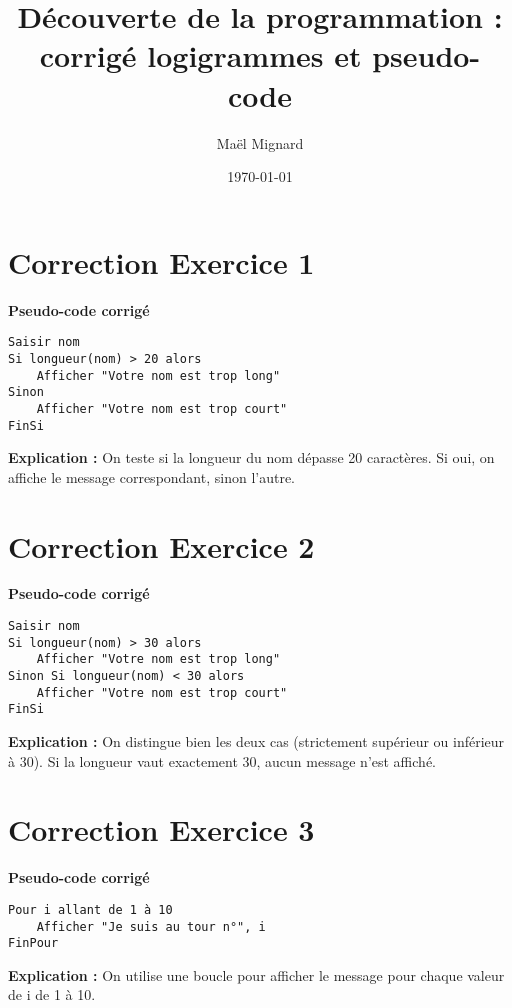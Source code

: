 \documentclass[12pt,a4paper]{article}
\title{Découverte de la programmation : corrigé logigrammes et pseudo-code}
\author{Maël Mignard}
\date{\today}
\begin{document}
\maketitle

\section*{Correction Exercice 1}
\textbf{Pseudo-code corrigé}
\begin{verbatim}
Saisir nom
Si longueur(nom) > 20 alors
    Afficher "Votre nom est trop long"
Sinon
    Afficher "Votre nom est trop court"
FinSi
\end{verbatim}
\textbf{Explication :} On teste si la longueur du nom dépasse 20 caractères. Si oui, on affiche le message correspondant, sinon l'autre.

\section*{Correction Exercice 2}
\textbf{Pseudo-code corrigé}
\begin{verbatim}
Saisir nom
Si longueur(nom) > 30 alors
    Afficher "Votre nom est trop long"
Sinon Si longueur(nom) < 30 alors
    Afficher "Votre nom est trop court"
FinSi
\end{verbatim}
\textbf{Explication :} On distingue bien les deux cas (strictement supérieur ou inférieur à 30). Si la longueur vaut exactement 30, aucun message n'est affiché.

\section*{Correction Exercice 3}
\textbf{Pseudo-code corrigé}
\begin{verbatim}
Pour i allant de 1 à 10
    Afficher "Je suis au tour n°", i
FinPour
\end{verbatim}
\textbf{Explication :} On utilise une boucle pour afficher le message pour chaque valeur de i de 1 à 10.
\end{document}
